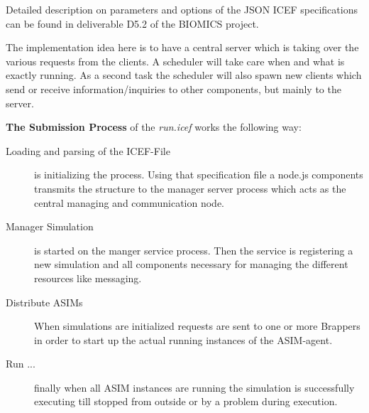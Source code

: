 Detailed description on parameters and options of the JSON ICEF specifications can be found in deliverable D5.2 \cite{BIOMICSD52} of the BIOMICS project.

The implementation idea here is to have a central server which is taking over the various requests from the clients. A scheduler will take care when and what is exactly running. As a second task the scheduler will also spawn new clients which send or receive information/inquiries to other components, but mainly to the server.

\textbf{The Submission Process} of the \textit{run.icef} works the following way:

\begin{description}
	\item [Loading and parsing of the ICEF-File] is initializing the process. Using that specification file a node.js components transmits the structure to the manager server process which acts as the central managing and communication node.
	\item [Manager Simulation] is started on the manger service process. Then the service is registering a new simulation and all components necessary for managing the different resources like messaging.
	\item [Distribute ASIMs] When simulations are initialized requests are sent to one or more Brappers in order to start up the actual running instances of the ASIM-agent.
	\item [Run ...] finally when all ASIM instances are running the simulation is successfully executing till stopped from outside or by a problem during execution.
\end{description}

